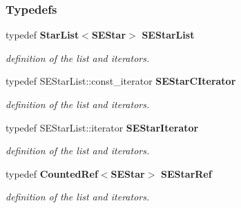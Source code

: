 \subsubsection*{Typedefs}
\begin{CompactItemize}
\item 
{}
typedef {\bf Star\-List}$<${\bf SEStar}$>$ {\bf SEStar\-List}\label{sestar_h_a5}

\begin{CompactList}\small\item\em definition of the list and iterators.\item\end{CompactList}\item 
{}
typedef SEStar\-List::const\_\-iterator {\bf SEStar\-CIterator}\label{sestar_h_a6}

\begin{CompactList}\small\item\em definition of the list and iterators.\item\end{CompactList}\item 
{}
typedef SEStar\-List::iterator {\bf SEStar\-Iterator}\label{sestar_h_a7}

\begin{CompactList}\small\item\em definition of the list and iterators.\item\end{CompactList}\item 
{}
typedef {\bf Counted\-Ref}$<${\bf SEStar}$>$ {\bf SEStar\-Ref}\label{sestar_h_a8}

\begin{CompactList}\small\item\em definition of the list and iterators.\item\end{CompactList}\end{CompactItemize}
